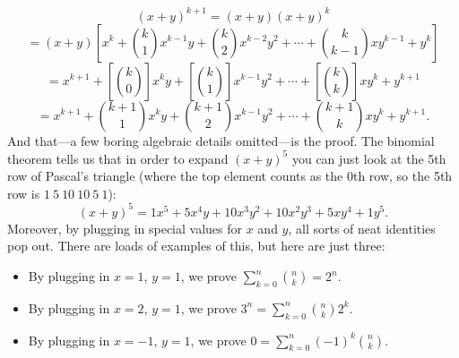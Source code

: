 \documentclass{report}
\begin{document}
\begin{itemize}
            \[
                (x + y)^{k+1} = (x + y)(x + y)^k
            \]
            \[
                = (x + y) \left[ x^k + \binom{k}{1}x^{k-1}y + \binom{k}{2}x^{k-2}y^2 + \cdots + \binom{k}{k-1}xy^{k-1} + y^k \right]
            \]
            \[
                = x^{k+1} + \left[\binom{k}{0}\right]x^k y + \left[\binom{k}{1}\right]x^{k-1}y^2 + \cdots + \left[\binom{k}{k}\right]xy^k + y^{k+1}
            \]
            \[
                = x^{k+1} + \binom{k+1}{1}x^k y + \binom{k+1}{2}x^{k-1}y^2 + \cdots + \binom{k+1}{k}xy^k + y^{k+1}.
            \]
            And that—a few boring algebraic details omitted—is the proof.
            \bigbreak \noindent 
            The binomial theorem tells us that in order to expand $(x + y)^5$ you can just look at the 5th row of Pascal’s triangle (where the top element counts as the $0$th row, so the 5th row is $1 \ 5 \ 10 \ 10 \ 5 \ 1$):
            \[
                (x + y)^5 = 1x^5 + 5x^4y + 10x^3y^2 + 10x^2y^3 + 5xy^4 + 1y^5.
            \]
            Moreover, by plugging in special values for $x$ and $y$, all sorts of neat identities pop out. There are loads of examples of this, but here are just three:
            \begin{itemize}
                \item By plugging in $x = 1$, $y = 1$, we prove $\sum_{k=0}^n \binom{n}{k} = 2^n$.
                \item By plugging in $x = 2$, $y = 1$, we prove $3^n = \sum_{k=0}^n \binom{n}{k}2^k$.
                \item By plugging in $x = -1$, $y = 1$, we prove $0 = \sum_{k=0}^n (-1)^k \binom{n}{k}$.
            \end{itemize}



    \end{itemize}

    \pagebreak 
\end{document}

